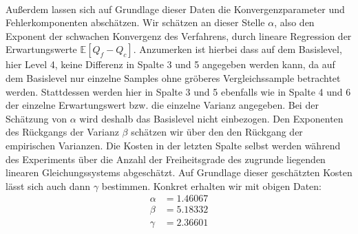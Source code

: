                                                                            \\
Außerdem lassen sich auf Grundlage dieser Daten die Konvergenzparameter und Fehlerkomponenten abschätzen. 
Wir schätzen an dieser Stelle $ \alpha $, also den Exponent der schwachen Konvergenz des Verfahrens, durch lineare Regression der Erwartungswerte $ \mathbb{E}[Q_f - Q_c] $. Anzumerken ist hierbei dass auf dem Basislevel, hier Level 4, keine Differenz in Spalte 3 und 5 angegeben werden kann, da auf dem Basislevel nur einzelne Samples ohne gröberes Vergleichssample betrachtet werden. Stattdessen werden hier in Spalte 3 und 5 ebenfalls wie in Spalte 4 und 6 der einzelne Erwartungswert bzw. die einzelne Varianz angegeben. Bei der Schätzung von $ \alpha $ wird deshalb das Basislevel nicht einbezogen.
Den Exponenten des Rückgangs der Varianz $ \beta $ schätzen wir über den den Rückgang der empirischen Varianzen. Die Kosten in der letzten Spalte selbst werden während des Experiments über die Anzahl der Freiheitsgrade des zugrunde liegenden linearen Gleichungssystems abgeschätzt. 
Auf Grundlage dieser geschätzten Kosten lässt sich auch dann $ \gamma $ bestimmen.
Konkret erhalten wir mit obigen Daten: 
\begin{align*}
	\alpha  &=    1.46067   \\
	\beta   &=    5.18332   \\
	\gamma  &=    2.36601   \\
\end{align*}
